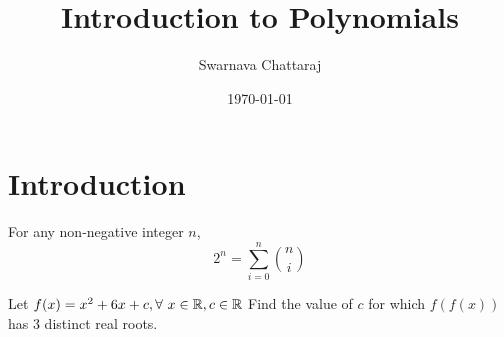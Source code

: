 \documentclass{scrartcl} %
\title{Introduction to Polynomials}
\author{Swarnava Chattaraj}
\date{\today}
\begin{document}
\maketitle

\section{Introduction} %
\begin{theorem}
For any non-negative integer \( n \),
\[ 2^n = \sum_{i = 0}^{n} \binom{n}{i} \]
\end{theorem}
\newpage
\begin{example}
Let $f(x) = x^2 + 6x + c, \forall\ x \in \mathbb R, c \in \mathbb R$
Find the value of $c$ for which $f(f(x))$ has 3
distinct real roots.
\end{example}
\end{document}
